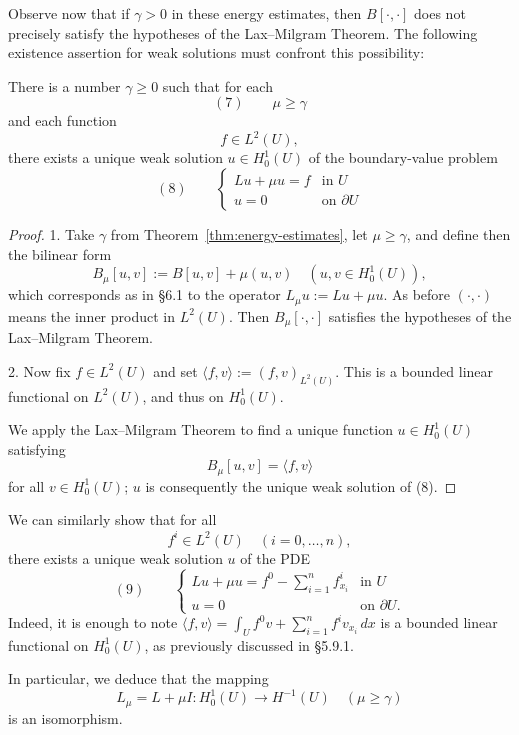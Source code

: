 Observe now that if $\gamma > 0$ in these energy estimates, then $B[\cdot,\cdot]$ does not precisely satisfy the hypotheses of the Lax--Milgram Theorem. The following existence assertion for weak solutions must confront this possibility:

\begin{theorem}
\label{thm:first-existence-weak-solutions}
There is a number $\gamma \geq 0$ such that for each
$$(7) \qquad \mu \geq \gamma$$
and each function
$$f \in L^2(U),$$
there exists a unique weak solution $u \in H_0^1(U)$ of the boundary-value problem
$$(8) \qquad \begin{cases} Lu + \mu u = f & \text{in } U \\ u = 0 & \text{on } \partial U \end{cases}$$
\end{theorem}

\begin{proof}
1. Take $\gamma$ from Theorem~\ref{thm:energy-estimates}, let $\mu \geq \gamma$, and define then the bilinear form
$$B_\mu[u,v] := B[u,v] + \mu(u,v) \quad (u,v \in H_0^1(U)),$$
which corresponds as in \S6.1 to the operator $L_\mu u := Lu + \mu u$. As before $(\cdot,\cdot)$ means the inner product in $L^2(U)$. Then $B_\mu[\cdot,\cdot]$ satisfies the hypotheses of the Lax--Milgram Theorem.

2. Now fix $f \in L^2(U)$ and set $\langle f,v \rangle := (f,v)_{L^2(U)}$. This is a bounded linear functional on $L^2(U)$, and thus on $H_0^1(U)$.

We apply the Lax--Milgram Theorem to find a unique function $u \in H_0^1(U)$ satisfying
$$B_\mu[u,v] = \langle f,v \rangle$$
for all $v \in H_0^1(U)$; $u$ is consequently the unique weak solution of (8).
\end{proof}

\begin{remark}
\label{rem:general-rhs-weak-solution-isomorphism}
We can similarly show that for all
$$f^i \in L^2(U) \quad (i=0,\ldots,n),$$
there exists a unique weak solution $u$ of the PDE
$$(9) \qquad \begin{cases} Lu + \mu u = f^0 - \sum_{i=1}^n f^i_{x_i} & \text{in } U \\ u = 0 & \text{on } \partial U. \end{cases}$$
Indeed, it is enough to note $\langle f,v \rangle = \int_U f^0v + \sum_{i=1}^n f^iv_{x_i}\,dx$ is a bounded linear functional on $H_0^1(U)$, as previously discussed in \S5.9.1.

In particular, we deduce that the mapping
$$L_\mu = L + \mu I : H_0^1(U) \to H^{-1}(U) \quad (\mu \geq \gamma)$$
is an isomorphism.
\end{remark}

